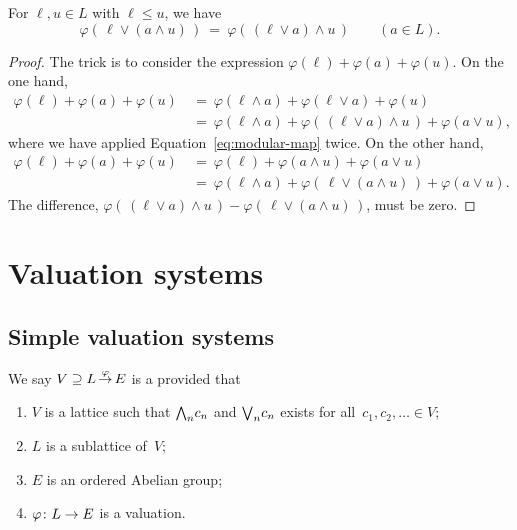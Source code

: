 \documentclass[main.tex]{subfiles}
\begin{document}
%
%
\begin{lem}
\label{L:modular-map-modular}
For $\ell,u\in L$ with $\ell\leq u$, we have
\begin{equation}
\label{eq:modular-map}
\varphi(\,\ell \vee (a \wedge u)\,) 
\ =\ 
\varphi(\,(\ell\vee a)\wedge u\,)
\qquad (a\in L).
\end{equation}
\begin{proof}
The trick is to consider the expression 
$\varphi(\ell) + \varphi(a) + \varphi(u)$.
On the one hand,
\begin{align*}
\varphi(\ell) + \varphi(a) + \varphi(u)
\ &=\ \varphi(\ell\wedge a) + \varphi(\ell \vee a) + \varphi(u) \\
\ &=\ \varphi(\ell \wedge a)
      + \varphi(\,(\ell\vee a)\wedge u\,)
      + \varphi(a\vee u),
\end{align*}
where we have applied Equation~\eqref{eq:modular-map} twice.
On the other hand,
\begin{align*}
\varphi(\ell) + \varphi(a) + \varphi(u)
\ &=\ \varphi(\ell) + \varphi(a\wedge u) + \varphi(a \vee u) \\
\ &=\ \varphi(\ell \wedge a)
      + \varphi(\,\ell\vee (a\wedge u)\,)
      + \varphi(a\vee u).
\end{align*}
The difference,
$\varphi(\,(\ell\vee a)\wedge u\,)
- \varphi(\,\ell\vee (a\wedge u)\,)$,
must be zero.
\end{proof}
\end{lem}



\section{Valuation systems}
\subsection{Simple valuation systems}
%
%
\begin{dfn}
\label{D:simple-system}
We say $V \supseteq L\,\smash{\stackrel{\varphi}{\rightarrow}}\,E$
 is a 
provided that
\begin{enumerate}
\item \label{D:simple-system-1}
$V$ is a lattice
such that $\textstyle{\bigwedge}_n c_n$ and $\textstyle{\bigvee}_n c_n$ exists for all~$c_1,c_2,\dotsc\in V$;
\item \label{D:simple-system-2}
$L$ is a sublattice of~$V$;
\item \label{D:simple-system-3}
$E$ is an ordered Abelian group;
\item \label{D:simple-system-4}
$\varphi\colon L\rightarrow E$ is a valuation.
\end{enumerate}
\end{dfn}
\end{document}

